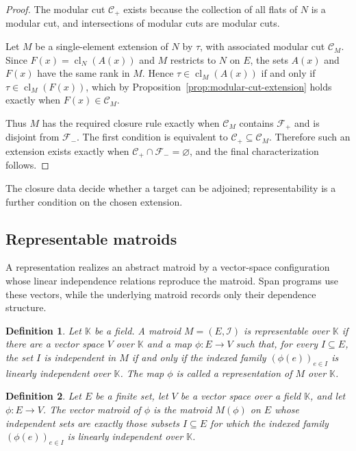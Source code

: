 \documentclass[11pt]{article}
\numberwithin{equation}{section}
\newtheorem{definition}{Definition}[section]
\theoremstyle{remark}
\newcommand{\cl}{\operatorname{cl}}
\begin{document}
\begin{proof}
The modular cut $\mathcal C_+$ exists because the collection of all flats of $N$ is a modular cut, and intersections of modular cuts are modular cuts.

Let $M$ be a single-element extension of $N$ by $\tau$, with associated modular cut $\mathcal C_M$. Since $F(x)=\cl_N(A(x))$ and $M$ restricts to $N$ on $E$, the sets $A(x)$ and $F(x)$ have the same rank in $M$. Hence $\tau\in\cl_M(A(x))$ if and only if $\tau\in\cl_M(F(x))$, which by Proposition~\ref{prop:modular-cut-extension} holds exactly when $F(x)\in\mathcal C_M$.

Thus $M$ has the required closure rule exactly when $\mathcal C_M$ contains $\mathcal F_+$ and is disjoint from $\mathcal F_-$. The first condition is equivalent to $\mathcal C_+\subseteq\mathcal C_M$. Therefore such an extension exists exactly when $\mathcal C_+\cap\mathcal F_-=\varnothing$, and the final characterization follows.
\end{proof}

The closure data decide whether a target can be adjoined; representability is a further condition on the chosen extension.

\subsection{Representable matroids}
\label{subsec:representable-matroids}

A representation realizes an abstract matroid by a vector-space configuration
whose linear independence relations reproduce the matroid. Span programs use
these vectors, while the underlying matroid records only their dependence
structure.

\begin{definition}
\label{def:matroid-representability}
Let $\mathbb K$ be a field. A matroid $M=(E,\mathcal I)$ is \emph{representable over $\mathbb K$} if there are a vector space $V$ over $\mathbb K$ and a map $\phi:E\to V$ such that, for every $I\subseteq E$, the set $I$ is independent in $M$ if and only if the indexed family $(\phi(e))_{e\in I}$ is linearly independent over $\mathbb K$. The map $\phi$ is called a \emph{representation} of $M$ over $\mathbb K$.
\end{definition}

\begin{definition}
\label{def:vector-matroid}
Let $E$ be a finite set, let $V$ be a vector space over a field $\mathbb K$, and let $\phi:E\to V$. The \emph{vector matroid of $\phi$} is the matroid $M(\phi)$ on $E$ whose independent sets are exactly those subsets $I\subseteq E$ for which the indexed family $(\phi(e))_{e\in I}$ is linearly independent over $\mathbb K$.
\end{definition}
\end{document}
